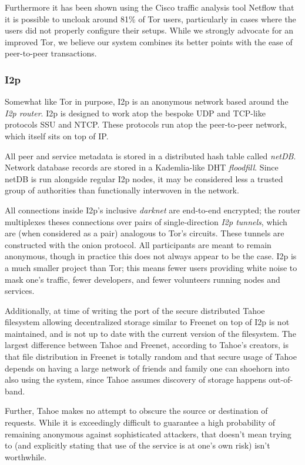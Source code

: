 Furthermore it has been shown using the Cisco traffic analysis tool Netflow that it is possible to uncloak around 81\% of
Tor users, particularly in cases where the users did not properly configure their setups. While we strongly advocate for
an improved Tor, we believe our system combines its better points with the ease of peer-to-peer transactions.

\subsubsection*{I2p}

Somewhat like Tor in purpose, I2p is an anonymous network based around the \textit{I2p router}. I2p is designed to work
atop the bespoke UDP and TCP-like protocols SSU and NTCP. These protocols run atop the peer-to-peer network, which itself
sits on top of IP.

All peer and service metadata is stored in a distributed hash table called \textit{netDB}. Network database records are stored
in a Kademlia-like DHT \textit{floodfill}. Since netDB is run alongside regular I2p nodes, it may be considered less a trusted
group of authorities than functionally interwoven in the network.

All connections inside I2p's inclusive \textit{darknet} are end-to-end encrypted; the router multiplexes theses connections over
pairs of single-direction \textit{I2p tunnels}, which are (when considered as a pair) analogous to Tor's circuits. These tunnels
are constructed with the onion protocol. All participants are meant to remain anonymous, though in practice this does not always
appear to be the case. I2p is a much smaller project than Tor; this means fewer users providing white noise to mask one's traffic,
fewer developers, and fewer volunteers running nodes and services.

Additionally, at time of writing the port of the secure distributed Tahoe filesystem allowing decentralized storage similar
to Freenet on top of I2p is not maintained, and is not up to date with the current version of the filesystem. The largest difference
between Tahoe and Freenet, according to Tahoe's creators, is that file distribution in Freenet is totally random and that secure
usage of Tahoe depends on having a large network of friends and family one can shoehorn into also using the system, since Tahoe assumes
discovery of storage happens out-of-band.

Further, Tahoe makes no attempt to obscure the source or destination of requests. While it is exceedingly difficult to guarantee a
high probability of remaining anonymous against sophisticated attackers, that doesn't mean trying to (and explicitly stating that
use of the service is at one's own risk) isn't worthwhile.

